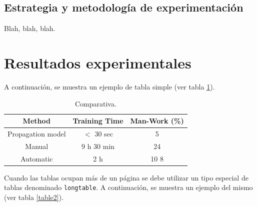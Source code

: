 \documentclass[spanish,openright]{book}
\begin{document}
 

\subsection{Estrategia y metodología de experimentación}
\label{sec:estr-y-metod}

Blah, blah, blah.


\section{Resultados experimentales}
\label{sec:result-experim}

A continuación, se muestra un ejemplo de tabla simple (ver tabla \ref{table1}).

\begin{table}
\renewcommand{\arraystretch}{1.3}
  \caption{Comparativa.}
  \label{table1}
  \begin{center}
\begin{tabular}{|c|c|c|}
      \hline
      Method & Training Time & Man-Work (\%)\\
      \hline
      Propagation model & $<$ 30 sec & 5\\
      \hline
      Manual & 9 h 30 min & 24\\
      \hline
      Automatic & 2 h & 10 8\\
      \hline
    \end{tabular}
  \end{center}
\end{table}

Cuando las tablas ocupan más de un página se debe utilizar un tipo
especial de tablas denominado \texttt{longtable}. A continuación, se
muestra un ejemplo del mismo (ver tabla \ref{table2}).
\end{document}
